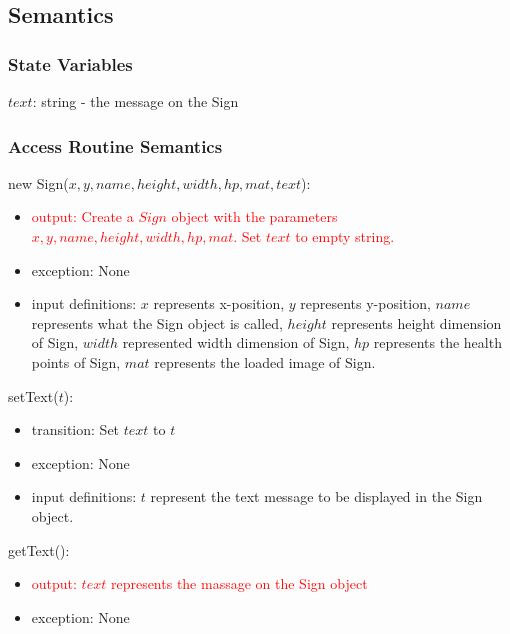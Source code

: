 \documentclass[12pt]{article}
\newcommand{\m}[1]{\mbox{#1}}
\begin{document}
\subsection*{Semantics}

\subsubsection*{State Variables}

$text$: string - the message on the Sign

\subsubsection*{Access Routine Semantics}

new Sign($x, y, name, height, width, hp, mat, text$):
\begin{itemize}
    \item \textcolor{red}{output: Create a $Sign$ object with the parameters $x, y, name, height, width, hp, mat$. Set $text$ to empty string.}
    \item exception: None
    \item input definitions: $x$ represents x-position, $y$ represents y-position, $name$ represents what the Sign object is called, $height$ represents height dimension of Sign, $width$ represented width dimension of Sign, $hp$ represents the health points of Sign, $mat$ represents the loaded image of Sign.
\end{itemize}

\noindent setText($t$):
\begin{itemize}
    \item transition: Set $text$ to $t$
    \item exception: None
    \item input definitions: $t$ represent the text message to be displayed in the Sign object. 
\end{itemize}

\noindent getText():
\begin{itemize}
    \item \textcolor{red}{output: $text$ represents the massage on the Sign object}
    \item exception: None
\end{itemize}
\end{document}
